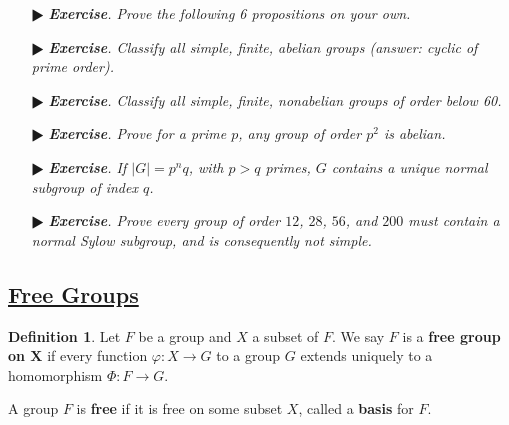 \documentclass[11pt]{amsart}
\theoremstyle{definition}
\newtheorem*{definition*}{Definition}
\renewcommand\:{\colon}
\newcommand{\1}{\mathds{1}}
\newcommand{\exc}[1]{\vspace{-2.5pt}\begin{itemize}[leftmargin=15pt]\item[$\RHD$] \textit{\textbf{Exercise}. #1}\end{itemize}}
\begin{document}
\exc{Prove the following 6 propositions on your own.}

\exc{Classify all simple, finite, abelian groups (answer: cyclic of prime order).}
\exc{Classify all simple, finite, nonabelian groups of order below 60.}
\exc{Prove for a prime $p$, any group of order $p^2$ is abelian.}
\exc{If $|G| = p^nq$, with $p > q$ primes, $G$ contains a unique normal subgroup of index $q$.}
\exc{Prove every group of order $12$, $28$, $56$, and $200$ must contain a normal Sylow subgroup, and is consequently not simple.}

\vskip20pt



\subsection*{\underline{Free Groups}}

\begin{definition*}
	Let $F$ be a group and $X$ a subset of $F$. We say $F$ is a \textbf{free group on $\boldsymbol{X}$} if every function $\varphi\: X \to G$ to a group $G$ extends uniquely to a homomorphism $\Phi \: F \to G$.
	\begin{center}
	\end{center}
	A group $F$ is \textbf{free} if it is free on some subset $X$, called a \textbf{basis} for $F$.
\end{definition*}
\end{document}
